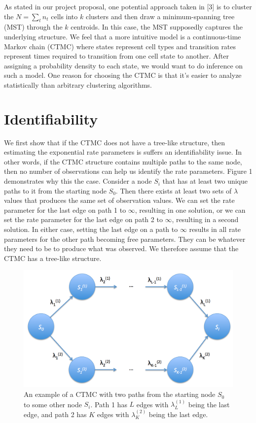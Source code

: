 \documentclass[11pt,onecolumn]{article}
\begin{document}
As stated in our project proposal, one potential approach taken in [3] is to cluster the $N = \sum_{t} n_t$ cells into $k$ clusters and then draw a minimum-spanning tree (MST) through the $k$ centroids. In this case, the MST supposedly captures the underlying structure. We feel that a more intuitive model is a continuous-time Markov chain (CTMC) where states represent cell types and transition rates represent times required to transition from one cell state to another. After assigning a probability density to each state, we would want to do inference on such a model. One reason for choosing the CTMC is that it's easier to analyze statistically than arbitrary clustering algorithms. 
 
\section{Identifiability}
We first show that if the CTMC does not have a tree-like structure, then estimating the exponential rate parameters is suffers an identifiability issue. In other words, if the CTMC structure contains multiple paths to the same node, then no number of observations can help us identify the rate parameters. Figure 1 demonstrates why this the case. Consider a node $S_i$ that has at least two unique paths to it from the starting node $S_0$. Then there exists at least two sets of $\lambda$ values that produces the same set of observation values. We can set the rate parameter for the last edge on path 1 to $\infty$, resulting in one solution, or we can set the rate parameter for the last edge on path 2 to $\infty$, resulting in a second solution. In either case, setting the last edge on a path to $\infty$ results in all rate parameters for the other path becoming free parameters. They can be whatever they need to be to produce what was observed. We therefore assume that the CTMC has a tree-like structure.

\begin{figure}[!htb]
		\captionsetup{width=.8\linewidth}
		\caption{An example of a CTMC with two paths from the starting node $S_0$ to some other node $S_i$. Path 1 has $L$ edges with $\lambda_L^{(1)}$ being the last edge, and path 2 has $K$ edges with $\lambda_K^{(2)}$ being the last edge.}
		\centering
		\includegraphics[scale=0.2]{Fig0.png}
\end{figure}
\end{document}
